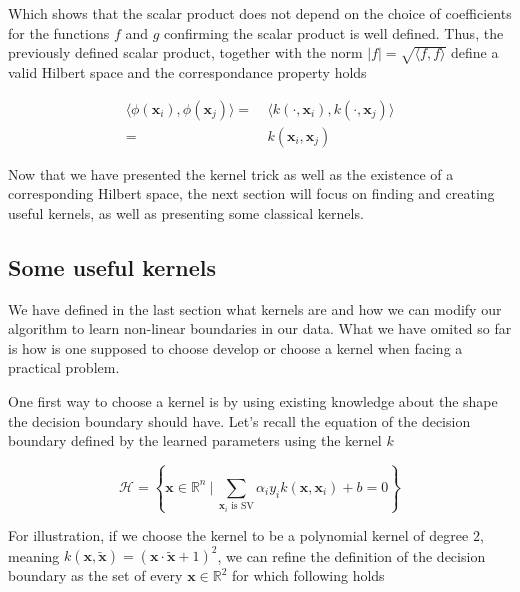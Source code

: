 Which shows that the scalar product does not depend on the choice of coefficients for the functions $f$ and $g$ confirming the scalar product is well defined. Thus, the previously defined scalar product, together with the norm $|f| = \sqrt{\langle f, f\rangle }$ define a valid Hilbert space and the correspondance property holds

\begin{equation*}
  \begin{aligned}
    \langle \phi(\mathbf{x}_i), \phi(\mathbf{x}_j)\rangle =\ &\langle k\left(\cdot, \mathbf{x}_i\right), k\left(\cdot, \mathbf{x}_j\right)\rangle \\
    =\ &k(\mathbf{x}_i, \mathbf{x}_j)
  \end{aligned}
\end{equation*}

Now that we have presented the kernel trick as well as the existence of a corresponding Hilbert space, the next section will focus on finding and creating useful kernels, as well as presenting some classical kernels.

\subsection {Some useful kernels}

We have defined in the last section what kernels are and how we can modify our algorithm to learn non-linear boundaries in our data. What we have omited so far is how is one supposed to choose develop or choose a kernel when facing a practical problem.

One first way to choose a kernel is by using existing knowledge about the shape the decision boundary should have. Let's recall the equation of the decision boundary defined by the learned parameters using the kernel $k$

\begin{equation*}
  \mathscr{H} = \left\{\mathbf{x} \in \mathbb{R}^n\ |\ \sum_{\mathbf{x}_i \text{ is SV}}\alpha_iy_ik\left(\mathbf{x}, \mathbf{x}_i\right) + b = 0\right\}
\end{equation*}

For illustration, if we choose the kernel to be a polynomial kernel of degree $2$, meaning $k\left(\mathbf{x}, \mathbf{\tilde{x}}\right) = \left(\mathbf{x} \cdot \mathbf{\tilde{x}} + 1\right)^2$, we can refine the definition of the decision boundary as the set of every $\mathbf{x} \in \mathbb{R}^2$ for which following holds

